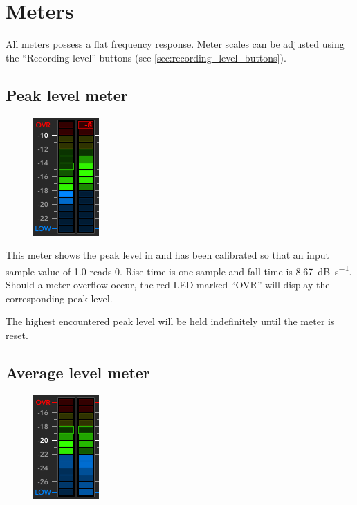 \chapter{Meters}
\label{chap:meters}

All meters possess a flat frequency response.  Meter scales can be
adjusted using the ``Recording level'' buttons (see
\ref{sec:recording_level_buttons}).

\section{Peak level meter}

\begin{figure}
\includegraphics[scale=\screenshotscale,clip]{include/images/level_meter_peak.png}
\end{figure}

This meter shows the peak level in \si{\dBFS} and has been calibrated
so that an input sample value of \num{1.0} reads \SI{0}{\dBFS}.  Rise
time is one sample and fall time is \SI{8.67}{\dB\per\second}.  Should
a meter overflow occur, the red LED marked ``OVR'' will display the
corresponding peak level.

The highest encountered peak level will be held indefinitely until the
meter is reset.

\newpage %

\section{Average level meter}

\begin{figure}
\includegraphics[scale=\screenshotscale,clip]{include/images/level_meter_average.png}
\end{figure}


